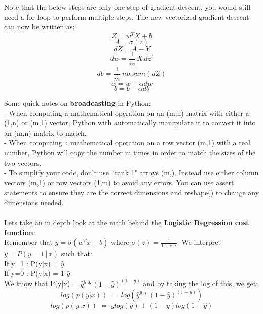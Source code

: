 \documentclass[11pt, a4paper]{article}
\begin{document}
\begin{spacing}{1.1}
	Note that the below steps are only one step of gradient descent, you would still need a for loop to perform multiple steps. The new vectorized gradient descent can now be written as: \\
	$$ Z = w^TX+b$$ 
	$$ A = \sigma(z)$$ 
	$$ dZ = A-Y$$ 
	$$ dw = \frac{1}{m}\,X\,dz^t$$ 
	$$ db = \frac{1}{m}\ np.sum(dZ)$$ 
	$$w = w - \alpha dw$$
	$$b = b - \alpha db$$ \newpage

	\noindent Some quick notes on \textbf{broadcasting} in Python: \vspace*{1mm} \\
	\hspace*{2mm} - When computing a mathematical operation on an (m,n) matrix with either a (1,n) or (m,1) vector, \hspace*{5mm} Python with automatically manipulate it to convert it into an (m,n) matrix to match. \vspace*{1mm} \\
	\hspace*{2mm} - When computing a mathematical operation on a row vector (m,1) with a real number, Python will \hspace*{5mm} copy the number m times in order to match the sizes of the two vectors. \vspace*{1mm} \\
	\hspace*{2mm} - To simplify your code, don't use ``rank 1" arrays (m,). Instead use either column vectors (m,1) or \hspace*{5mm} row vectors (1,m) to avoid any errors. You can use assert statements to ensure they are the correct \hspace*{5mm} dimensions and reshape() to change any dimensions needed. \\~\\
	Lets take an in depth look at the math behind the \textbf{Logistic Regression cost function}: \vspace*{1mm} \\
	Remember that $\hat{y} = \sigma(w^Tx+b)$ where $\sigma(z) = \frac{1}{1+e^{-z}}$. We interpret $\hat{y} = P(y=1\,|\,x)$ such that: \\
	\hspace*{3mm} If y=1 : P(y$|$x) = $\hat{y}$ \\
	\hspace*{3mm} If y=0 : P(y$|$x) = 1-$\hat{y}$ \vspace*{1mm}\\
	We know that P(y$|$x) = $\hat{y}^y*(1-\hat{y})^{(1-y)}$ and by taking the log of this, we get: $$ log(p(y|x))\; = \; log(\hat{y}^y*(1-\hat{y})^{(1-y)})$$ $$ log(p(y|x))\; = \; ylog(\hat{y})+ (1-y)log(1-\hat{y})$$ 

\end{spacing}
\end{document}
